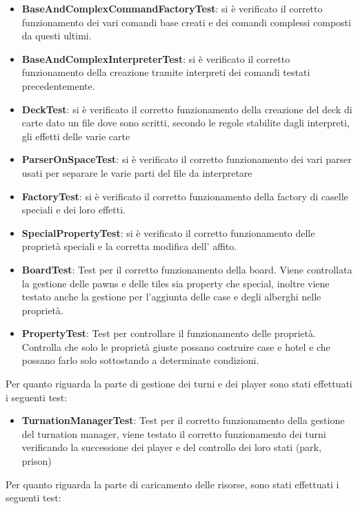 \begin{itemize}
    \item \textbf{BaseAndComplexCommandFactoryTest}: si è verificato il corretto funzionamento dei vari comandi base creati e dei comandi complessi composti da questi ultimi.
    \item \textbf{BaseAndComplexInterpreterTest}: si è verificato il corretto funzionamento della creazione tramite interpreti dei comandi testati precedentemente.
    \item \textbf{DeckTest}: si è verificato il corretto funzionamento della creazione del deck di carte dato un file dove sono scritti, secondo le regole stabilite dagli interpreti, gli effetti delle varie carte
    \item \textbf{ParserOnSpaceTest}: si è verificato il corretto funzionamento dei vari parser usati per separare le varie parti del file da interpretare
    \item \textbf{FactoryTest}: si è verificato il corretto funzionamento della factory di caselle speciali e dei loro effetti. 
    \item \textbf{SpecialPropertyTest}: si è verificato il corretto funzionamento delle proprietà speciali e la corretta modifica dell' affito.
    \item \textbf{BoardTest}: Test per il corretto funzionamento della board. Viene controllata la gestione delle pawns e delle tiles sia property che special, inoltre viene testato anche la gestione per l'aggiunta delle case e degli alberghi nelle proprietà.
    \item \textbf{PropertyTest}: Test per controllare il funzionamento delle proprietà. Controlla che solo le proprietà giuste possano costruire case e hotel e che possano farlo solo sottostando a determinate condizioni.
\end{itemize}
Per quanto riguarda la parte di gestione dei turni e dei player sono stati effettuati i seguenti test:\newline
\begin{itemize}
    \item \textbf{TurnationManagerTest}: Test per il corretto funzionamento della gestione del turnation manager, viene testato il corretto funzionamento dei turni verificando la successione dei player e del controllo dei loro stati (park, prison)
\end{itemize}
Per quanto riguarda la parte di caricamento delle risorse, sono stati effettuati i seguenti test:\newline
